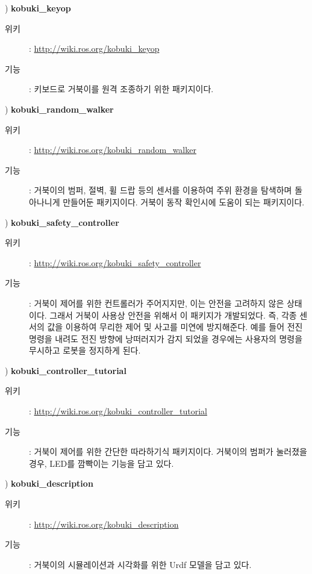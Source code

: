 \vspace{\baselineskip}
\noindent{}
\thenum) \textbf{kobuki\_keyop}
\begin{description}
\item[위키]: \url{http://wiki.ros.org/kobuki_keyop}
\item[기능]: 키보드로 거북이를 원격 조종하기 위한 패키지이다.
\end{description}

\vspace{\baselineskip}
\noindent{}
\thenum) \textbf{kobuki\_random\_walker}
\begin{description}
\item[위키]: \url{http://wiki.ros.org/kobuki_random_walker}
\item[기능]: 거북이의 범퍼, 절벽, 휠 드랍 등의 센서를 이용하여 주위 환경을 탐색하며 돌아나니게 만들어둔 패키지이다. 거북이 동작 확인시에 도움이 되는 패키지이다.
\end{description}

\vspace{\baselineskip}
\noindent{}
\thenum) \textbf{kobuki\_safety\_controller}
\begin{description}
\item[위키]: \url{http://wiki.ros.org/kobuki_safety_controller}
\item[기능]: 거북이 제어를 위한 컨트롤러가 주어지지만, 이는 안전을 고려하지 않은 상태이다. 그래서 거북이 사용상 안전을 위해서 이 패키지가 개발되었다. 즉, 각종 센서의 값을 이용하여 무리한 제어 및 사고를 미연에 방지해준다. 예를 들어 전진 명령을 내려도 전진 방향에 낭떠러지가 감지 되었을 경우에는 사용자의 명령을 무시하고 로봇을 정지하게 된다.
\end{description}

\vspace{\baselineskip}
\noindent{}
\thenum) \textbf{kobuki\_controller\_tutorial}
\begin{description}
\item[위키]: \url{http://wiki.ros.org/kobuki_controller_tutorial}
\item[기능]: 거북이 제어를 위한 간단한 따라하기식 패키지이다. 거북이의 범퍼가 눌러졌을 경우, LED를 깜빡이는 기능을 담고 있다.
\end{description}

\vspace{\baselineskip}
\noindent{}
\thenum) \textbf{kobuki\_description}
\begin{description}
\item[위키]: \url{http://wiki.ros.org/kobuki_description}
\item[기능]: 거북이의 시뮬레이션과 시각화를 위한 Urdf 모델을 담고 있다.
\end{description}

